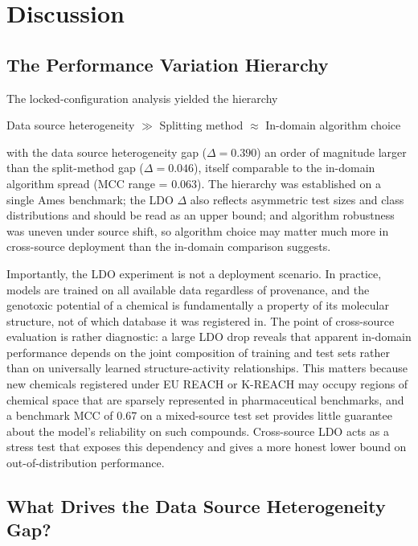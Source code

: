 \section{Discussion}

\subsection{The Performance Variation Hierarchy}

The locked-configuration analysis yielded the hierarchy

\begin{center}
Data source heterogeneity $\gg$ Splitting method $\approx$ In-domain algorithm choice
\end{center}

with the data source heterogeneity gap ($\Delta = 0.390$) an order of magnitude larger than the split-method gap ($\Delta = 0.046$), 
itself comparable to the in-domain algorithm spread (MCC range = 0.063). The hierarchy was established on a single Ames benchmark; 
the LDO $\Delta$ also reflects asymmetric test sizes and class distributions and should be read as an upper bound; and algorithm robustness was uneven under source shift, 
so algorithm choice may matter much more in cross-source deployment than the in-domain comparison suggests.

Importantly, the LDO experiment is not a deployment scenario.
In practice, models are trained on all available data regardless of provenance, and the genotoxic potential of a chemical is fundamentally a property of its molecular structure,
not of which database it was registered in. The point of cross-source evaluation is rather diagnostic:
a large LDO drop reveals that apparent in-domain performance depends on the joint composition of training and test sets rather than on universally learned structure-activity relationships.
This matters because new chemicals registered under EU REACH or K-REACH may occupy regions of chemical space that are sparsely represented in pharmaceutical benchmarks,
and a benchmark MCC of 0.67 on a mixed-source test set provides little guarantee about the model's reliability on such compounds.
Cross-source LDO acts as a stress test that exposes this dependency and gives a more honest lower bound on out-of-distribution performance.

\subsection{What Drives the Data Source Heterogeneity Gap?}

